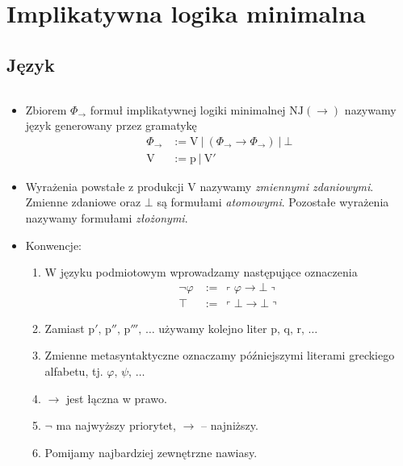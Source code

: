 \section{Implikatywna logika minimalna}
\subsection{Język}

\begin{definicja}$ $\newline
  \begin{itemize}
    \item  Zbiorem \(\Phi_{\to}\) formuł implikatywnej logiki minimalnej \(\mathrm{NJ}(\to)\) nazywamy język generowany przez gramatykę
    \begin{align*}
    \Phi_{\to} &:= \mathrm{V}\ |\ \left ( \Phi_{\to} \rightarrow \Phi_{\to} \right )\ |\ \bot\\
    \mathrm{V} &:= \mathrm{p}\ |\ \mathrm{V'}
    \end{align*}

    \item Wyrażenia powstałe z produkcji V nazywamy \emph{zmiennymi zdaniowymi}. Zmienne zdaniowe oraz \(\bot\) są formułami \emph{atomowymi}. Pozostałe wyrażenia nazywamy formułami \emph{złożonymi}.


\item  Konwencje: \begin{enumerate}
    \item W języku podmiotowym wprowadzamy następujące oznaczenia
    \begin{align*}
      \lnot \varphi &:=\ \left\ulcorner\varphi\rightarrow\bot\right\urcorner\\
      \top &:=\ \left\ulcorner\bot\rightarrow\bot\right\urcorner
    \end{align*}

    \item Zamiast \(\mathrm{p'},\, \mathrm{p''},\, \mathrm{p'''},\, \dots\) używamy kolejno liter \(\mathrm{p},\, \mathrm{q},\, \mathrm{r},\, \dots\)
    \item Zmienne metasyntaktyczne oznaczamy późniejszymi literami greckiego alfabetu, tj. \(\varphi,\, \psi,\, \dots\)
    \item \(\rightarrow\) jest łączna w prawo.
    \item \(\lnot\) ma najwyższy priorytet, \(\rightarrow\) – najniższy.
    \item Pomijamy najbardziej zewnętrzne nawiasy.
  \end{enumerate}


\end{itemize}
\end{definicja}
